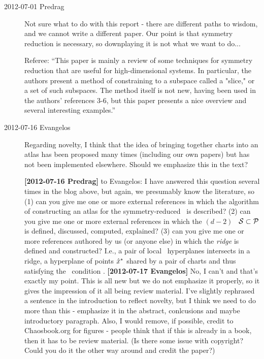 \begin{description}

\item[2012-07-01 Predrag] Not sure what to do with this report -
there are different paths to wisdom, and we cannot
write a different paper. Our point is that symmetry reduction is
necessary, so downplaying it is not what we want to do...

\bigskip

Referee: ``This paper is mainly a review of some techniques for symmetry reduction
that are useful for high-dimensional systems. In particular, the authors
present a method of constraining to a subspace called a "slice," or a set
of such subspaces. The method itself is not new, having been used in the
authors' references 3-6, but this paper presents a nice overview and
several interesting examples.''

\item[2012-07-16 Evangelos]
	Regarding novelty, I think that the idea of bringing together
	charts into an atlas has been proposed many times (including our
	own papers) but has not been implemented elsewhere. Should we
	emphasize this in the text?

{\bf [2012-07-16 Predrag]} to Evangelos: I have answered this question
several times in the blog above, but again, we presumably know the
literature, so
(1) can you give me one or more external references in which the
algorithm of constructing an atlas for the symmetry-reduced \statesp\ is
described?
(2) can you give me one or more external references in which the
$(d\!-\!2)$\dmn\ \emph{\poincBord} ${\cal S} \subset {\cal P}$ is defined,
discussed, computed, explained?
(3) can you give me one or more references authored by us (or anyone
else) in which the \emph{ridge} is defined and constructed? I.e., a pair
of  local \slice\ hyperplanes intersects in a
{ridge}, a  hyperplane {\PoincS} of points
$\hat{x}^*$ shared by a pair of charts and thus satisfying the \slice\
condition . {\bf [2012-07-17 Evangelos]} No, I can't and
that's exactly my point. This is all new but we do not emphasize it
properly, so it gives the impression of it all being review material.
I've slightly rephrased a sentence in the introduction to reflect novelty,
but I think we need to do more than this - emphasize it in the abstract,
conlcusions and maybe introductory paragraph. 
Also, I would remove, if possible, credit to Chaosbook.org 
for figures - people think
that if this is already in a book, then it has to be review material.
(Is there some issue with copyright? 
Could you do it the other way around and credit the paper?)



\end{description}

